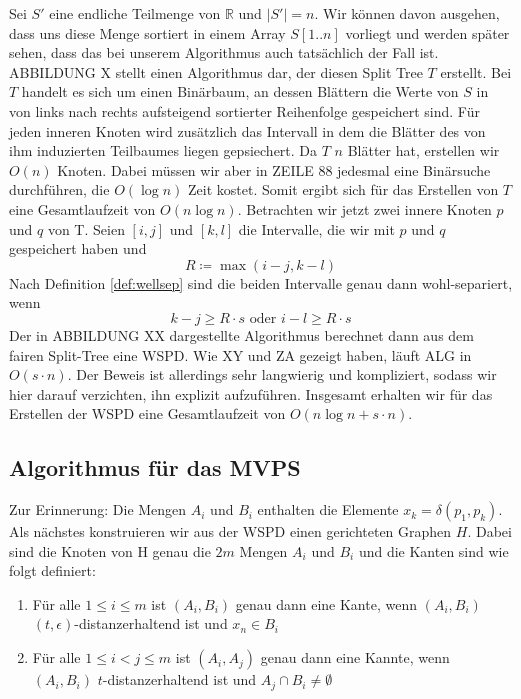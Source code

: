 \documentclass[11pt]{article}
\newcommand{\R}{\mathbb{R}}
\begin{document}
	Sei $S'$ eine endliche Teilmenge von $\R$ und $|S'| = n$. Wir können davon ausgehen, dass uns diese Menge sortiert in einem Array $S[1..n]$ vorliegt und werden später sehen, dass das bei unserem Algorithmus auch tatsächlich der Fall ist. ABBILDUNG X stellt einen Algorithmus dar, der diesen Split Tree $T$ erstellt. Bei $T$ handelt es sich um einen Binärbaum, an dessen Blättern die Werte von $S$ in von links nach rechts aufsteigend sortierter Reihenfolge gespeichert sind. Für jeden inneren Knoten wird zusätzlich das Intervall in dem die Blätter des von ihm induzierten Teilbaumes liegen gepsiechert.
	Da $T$ $n$ Blätter hat, erstellen wir $O(n)$ Knoten. Dabei müssen wir aber in ZEILE 88 jedesmal eine Binärsuche durchführen, die $O(\log n)$ Zeit kostet. Somit ergibt sich für das Erstellen von $T$ eine Gesamtlaufzeit von $O(n\log n)$.
	Betrachten wir jetzt zwei innere Knoten $p$ und $q$ von T. Seien $[i, j]$ und $[k, l]$ die Intervalle, die wir mit $p$ und $q$ gespeichert haben und 
	\[R \coloneqq \max(i - j, k - l)\]
	Nach Definition \ref{def:wellsep} sind die beiden Intervalle genau dann wohl-separiert, wenn 
	\[k - j \geq R \cdot s \text{ oder } i - l \geq R \cdot s \]
	Der in ABBILDUNG XX dargestellte Algorithmus berechnet dann aus dem fairen Split-Tree eine WSPD. Wie XY und ZA gezeigt haben, läuft ALG in $O(s\cdot n)$. Der Beweis ist allerdings sehr langwierig und kompliziert, sodass wir hier darauf verzichten, ihn explizit aufzuführen. Insgesamt erhalten wir für das Erstellen der WSPD eine Gesamtlaufzeit von $O(n\log n + s\cdot n).$
    \subsection{Algorithmus für das MVPS}
    \label{subsec:mvps}
    \textellipsis
    Zur Erinnerung: Die Mengen $A_i$ und $B_i$ enthalten die Elemente $x_k = \delta(p_1, p_k)$.
    Als nächstes konstruieren wir aus der WSPD einen gerichteten Graphen $H$. Dabei sind die Knoten von H genau die $2m$ Mengen $A_i$ und $B_i$ und die Kanten sind wie folgt definiert:
    \begin{enumerate}
    	\item Für alle $1 \leq i \leq m$ ist $(A_i, B_i)$ genau dann eine Kante, wenn $(A_i, B_i)$ $(t, \epsilon)$-distanzerhaltend ist und $x_n \in B_i$
    	\item Für alle $1\leq i < j \leq m$ ist $(A_i, A_j)$ genau dann eine Kannte, wenn $(A_i, B_i)$ $t$-distanzerhaltend ist und $A_j \cap B_i \neq \emptyset$
    \end{enumerate}
\end{document}
